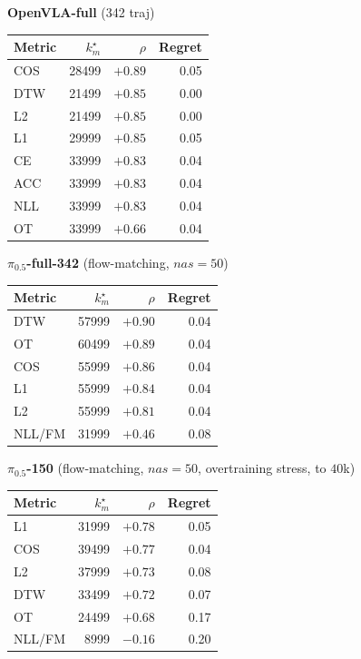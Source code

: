 \documentclass[11pt]{article}
\begin{document}
\begin{table}[h]
\begin{minipage}[t]{0.48\textwidth}
\centering \textbf{OpenVLA-full} (342 traj)\\[2pt]
\begin{tabular}{lrrr}
\toprule
Metric & $k_m^\star$ & $\rho$ & Regret \\ \midrule
COS    & 28499 & $+0.89$ & 0.05 \\
DTW    & 21499 & $+0.85$ & 0.00 \\
L2     & 21499 & $+0.85$ & 0.00 \\
L1     & 29999 & $+0.85$ & 0.05 \\
CE     & 33999 & $+0.83$ & 0.04 \\
ACC    & 33999 & $+0.83$ & 0.04 \\
NLL    & 33999 & $+0.83$ & 0.04 \\
OT     & 33999 & $+0.66$ & 0.04 \\
\bottomrule
\end{tabular}
\end{minipage}
\hfill
\begin{minipage}[t]{0.48\textwidth}
\centering \textbf{$\pi_{0.5}$-full-342} (flow-matching, $nas{=}50$)\\[2pt]
\begin{tabular}{lrrr}
\toprule
Metric & $k_m^\star$ & $\rho$ & Regret \\ \midrule
DTW    & 57999 & $+0.90$ & 0.04 \\
OT     & 60499 & $+0.89$ & 0.04 \\
COS    & 55999 & $+0.86$ & 0.04 \\
L1     & 55999 & $+0.84$ & 0.04 \\
L2     & 55999 & $+0.81$ & 0.04 \\
NLL/FM & 31999 & $+0.46$ & 0.08 \\
\bottomrule
\end{tabular}
\end{minipage}

\vspace{1em}

\begin{minipage}[t]{0.48\textwidth}
\centering \textbf{$\pi_{0.5}$-150} (flow-matching, $nas{=}50$, overtraining stress, to $40$k)\\[2pt]
\begin{tabular}{lrrr}
\toprule
Metric & $k_m^\star$ & $\rho$ & Regret \\ \midrule
L1     & 31999 & $+0.78$ & 0.05 \\
COS    & 39499 & $+0.77$ & 0.04 \\
L2     & 37999 & $+0.73$ & 0.08 \\
DTW    & 33499 & $+0.72$ & 0.07 \\
OT     & 24499 & $+0.68$ & 0.17 \\
NLL/FM &  8999 & $-0.16$ & 0.20 \\
\bottomrule
\end{tabular}
\end{minipage}
\end{table}
\end{document}
